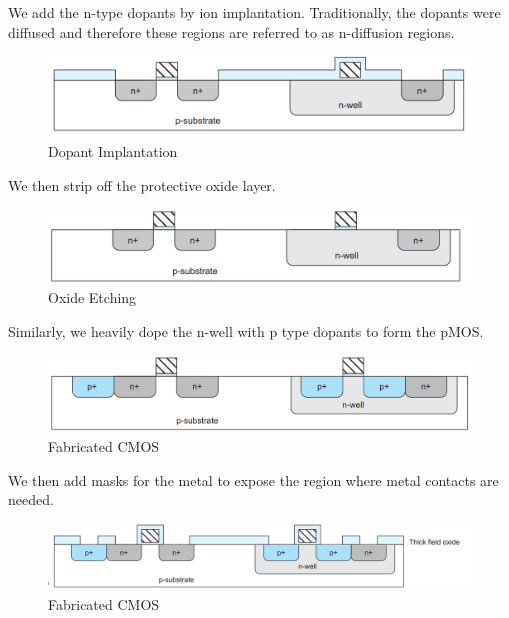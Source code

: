 \noindent We add the n-type dopants by ion implantation. Traditionally, the dopants were diffused and therefore these regions are referred to as n-diffusion regions.
\begin{figure}[H]
\centering
\includegraphics[scale=0.3]{./fig16} %
\caption{Dopant Implantation}
\label{3.16} %
\end{figure}
 



\noindent We then strip off the protective oxide layer.
\begin{figure}[H]
\centering
\includegraphics[scale=0.3]{./fig17} %
\caption{Oxide Etching}
\label{3.17} %
\end{figure}
 
\noindent Similarly, we heavily dope the n-well with p type dopants to form the pMOS.
\begin{figure}[H]
\centering
\includegraphics[scale=0.3]{./fig18} %
\caption{Fabricated CMOS}
\label{3.18} %
\end{figure}
 
\noindent We then add masks for the metal to expose the region where metal contacts are needed.
\begin{figure}[H]
\centering
\includegraphics[scale=0.3]{./fig19} %
\caption{Fabricated CMOS}
\label{3.19} %
\end{figure}
 
